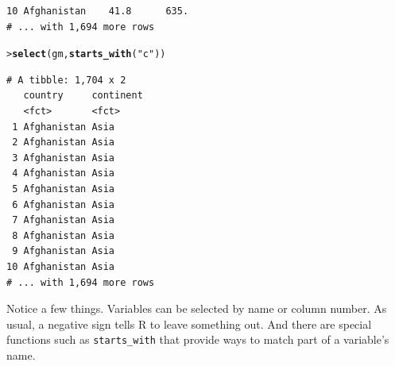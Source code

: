 \documentclass[12pt,oneside]{book}\usepackage[]{graphicx}\usepackage[]{color}
\makeatletter
\newcommand{\hlstr}[1]{\textcolor[rgb]{0.192,0.494,0.8}{#1}}%
\newcommand{\hlstd}[1]{\textcolor[rgb]{0.345,0.345,0.345}{#1}}%
\newcommand{\hlkwd}[1]{\textcolor[rgb]{0.737,0.353,0.396}{\textbf{#1}}}%
\newenvironment{kframe}{%
 \def\at@end@of@kframe{}%
 \ifinner\ifhmode%
  \def\at@end@of@kframe{\end{minipage}}%
  \begin{minipage}{\columnwidth}%
 \fi\fi%
 \def\FrameCommand##1{\hskip\@totalleftmargin \hskip-\fboxsep
 \colorbox{shadecolor}{##1}\hskip-\fboxsep
     \hskip-\linewidth \hskip-\@totalleftmargin \hskip\columnwidth}%
 \MakeFramed {\advance\hsize-\width
   \@totalleftmargin\z@ \linewidth\hsize
   \@setminipage}}%
 {\par\unskip\endMakeFramed%
 \at@end@of@kframe}
\newenvironment{knitrout}{}{} %
\makeatother
\begin{document}
\begin{knitrout}
\begin{kframe}
\begin{verbatim}
10 Afghanistan    41.8      635.
# ... with 1,694 more rows
\end{verbatim}
\begin{alltt}
\hlstd{> }\hlkwd{select}\hlstd{(gm,} \hlkwd{starts_with}\hlstd{(}\hlstr{"c"}\hlstd{))}
\end{alltt}
\begin{verbatim}
# A tibble: 1,704 x 2
   country     continent
   <fct>       <fct>    
 1 Afghanistan Asia     
 2 Afghanistan Asia     
 3 Afghanistan Asia     
 4 Afghanistan Asia     
 5 Afghanistan Asia     
 6 Afghanistan Asia     
 7 Afghanistan Asia     
 8 Afghanistan Asia     
 9 Afghanistan Asia     
10 Afghanistan Asia     
# ... with 1,694 more rows
\end{verbatim}
\end{kframe}
\end{knitrout}
Notice a few things. Variables can be selected by name or column number. As usual, a negative sign tells R to leave something out. And there are special functions such as \verb+starts_with+ that provide ways to match part of a variable's name. 
\end{document}
